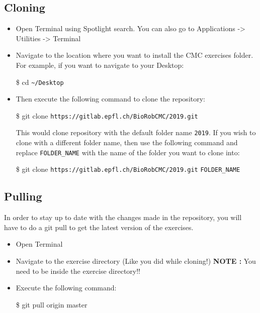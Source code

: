 \documentclass{cmc}
\begin{document}
\subsection{Cloning}
\label{sec:macos_cloning}
\begin{itemize}
\item Open Terminal using Spotlight search. You can also go to
  Applications -> Utilities -> Terminal
\item Navigate to the location where you want to install the CMC
  exercises folder. For example, if you want to navigate to your
  Desktop:

  \begin{center}
    \$ cd \verb|~/Desktop|
  \end{center}

\item Then execute the following command to clone the repository:
  \begin{center}
    \$ git clone \verb|https://gitlab.epfl.ch/BioRobCMC/2019.git|
  \end{center}

  This would clone repository with the default folder name
  \verb|2019|. If you wish to clone with a different folder name, then
  use the following command and replace \verb|FOLDER_NAME| with the
  name of the folder you want to clone into:
  \begin{center}
    \$ git clone \verb|https://gitlab.epfl.ch/BioRobCMC/2019.git|
    \verb|FOLDER_NAME|
  \end{center}

\end{itemize}

\subsection{Pulling}
\label{sec:macos_pulling}

In order to stay up to date with the changes made in the repository,
you will have to do a git pull to get the latest version of the
exercises.

\begin{itemize}
\item Open Terminal
\item Navigate to the exercise directory (Like you did while cloning!)
  \textbf{NOTE : } You need to be inside the exercise directory!!
\item Execute the following command:
  \begin{center}
    \$ git pull origin master
  \end{center}
\end{itemize}
\end{document}
